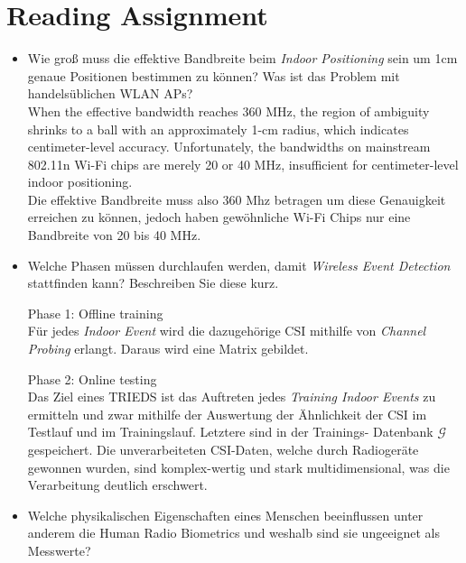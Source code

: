 \section{Reading Assignment}

\begin{itemize}
    \item Wie groß muss die effektive 
    Bandbreite beim \textit{Indoor Positioning} 
    sein um 1cm genaue Positionen bestimmen 
    zu können? Was ist das Problem mit 
    handelsüblichen WLAN APs?\\

    \glqq When the effective bandwidth reaches 
    360 MHz, the region of ambiguity shrinks to 
    a ball with an approximately 1-cm radius,
    which indicates centimeter-level accuracy.
    Unfortunately, the bandwidths on mainstream 
    802.11n Wi-Fi chips are merely 20 or 40 MHz, 
    insufficient for centimeter-level indoor 
    positioning.\grqq\\
    Die effektive Bandbreite muss also 360 Mhz 
    betragen um diese Genauigkeit erreichen zu 
    können, jedoch haben gewöhnliche Wi-Fi Chips 
    nur eine Bandbreite von 20 bis 40 MHz.\\[1mm]

    \item Welche Phasen müssen durchlaufen 
    werden, damit \textit{Wireless Event Detection}
    stattfinden kann?
    Beschreiben Sie diese kurz.


    Phase 1: Offline training\\
    Für jedes \textit{Indoor Event} wird die dazugehörige 
    CSI mithilfe von \textit{Channel Probing} erlangt. 
    Daraus wird eine Matrix gebildet.
    

    Phase 2: Online testing\\
    Das Ziel eines TRIEDS ist das Auftreten jedes \textit{
    Training Indoor Events} zu ermitteln und zwar mithilfe 
    der Auswertung der Ähnlichkeit der CSI im Testlauf und
    im Trainingslauf. Letztere sind in der Trainings-
    Datenbank \( \mathcal{G} \) gespeichert.
    Die unverarbeiteten CSI-Daten, welche durch 
    Radiogeräte gewonnen wurden, sind komplex-wertig 
    und stark multidimensional, was die Verarbeitung 
    deutlich erschwert.\\[1mm]

    \item Welche physikalischen Eigenschaften eines 
    Menschen beeinflussen unter anderem die Human
    Radio Biometrics und weshalb sind sie ungeeignet 
    als Messwerte?


\end{itemize}
